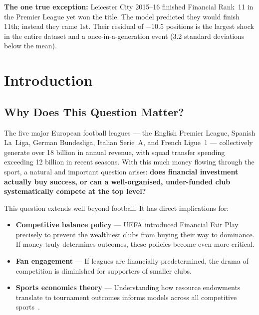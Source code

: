 \documentclass[11pt, a4paper]{article}
\begin{document}
\begin{alertbox}
  \textbf{The one true exception:} Leicester City 2015--16 finished Financial
  Rank~11 in the Premier League yet won the title. The model predicted they would
  finish 11th; instead they came 1st. Their residual of \(\mathbf{-10.5}\)
  positions is the largest shock in the entire dataset and a once-in-a-generation
  event (\(3.2\) standard deviations below the mean).
\end{alertbox}

\section{Introduction}

\subsection{Why Does This Question Matter?}

The five major European football leagues --- the English Premier League, Spanish
La~Liga, German Bundesliga, Italian Serie~A, and French Ligue~1 --- collectively
generate over \EUR{}18 billion in annual revenue, with squad transfer spending
exceeding \EUR{}12 billion in recent seasons. With this much money flowing through
the sport, a natural and important question arises: \textbf{does financial
investment actually buy success, or can a well-organised, under-funded club
systematically compete at the top level?}

This question extends well beyond football. It has direct implications for:

\begin{itemize}
  \item \textbf{Competitive balance policy} --- UEFA introduced Financial Fair Play
        precisely to prevent the wealthiest clubs from buying their way to
        dominance. If money truly determines outcomes, these policies become
        even more critical.
  \item \textbf{Fan engagement} --- If leagues are financially predetermined,
        the drama of competition is diminished for supporters of smaller clubs.
  \item \textbf{Sports economics theory} --- Understanding how resource endowments
        translate to tournament outcomes informs models across all competitive
        sports~\citep{Szymanski1999, Frick2007}.
\end{itemize}
\end{document}
